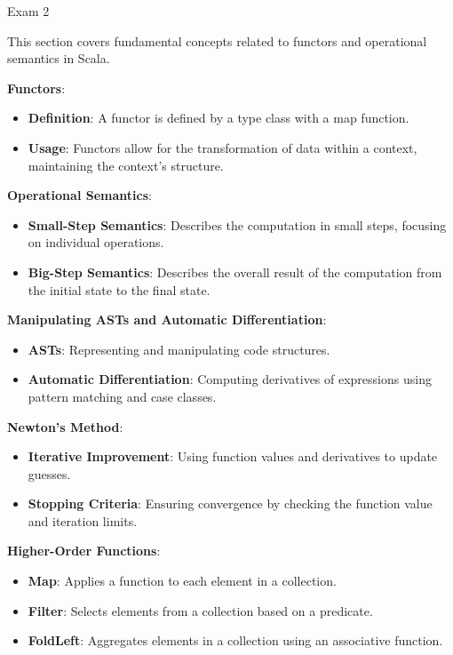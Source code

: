 \begin{examnotes}{Exam 2}
    \begin{highlight}
        This section covers fundamental concepts related to functors and operational semantics in Scala.
    
        \textbf{Functors}:
        \begin{itemize}
            \item \textbf{Definition}: A functor is defined by a type class with a map function.
            \item \textbf{Usage}: Functors allow for the transformation of data within a context, maintaining the context's structure.
        \end{itemize}
        
        \textbf{Operational Semantics}:
        \begin{itemize}
            \item \textbf{Small-Step Semantics}: Describes the computation in small steps, focusing on individual operations.
            \item \textbf{Big-Step Semantics}: Describes the overall result of the computation from the initial state to the final state.
        \end{itemize}
        
        \textbf{Manipulating ASTs and Automatic Differentiation}:
        \begin{itemize}
            \item \textbf{ASTs}: Representing and manipulating code structures.
            \item \textbf{Automatic Differentiation}: Computing derivatives of expressions using pattern matching and case classes.
        \end{itemize}
        
        \textbf{Newton's Method}:
        \begin{itemize}
            \item \textbf{Iterative Improvement}: Using function values and derivatives to update guesses.
            \item \textbf{Stopping Criteria}: Ensuring convergence by checking the function value and iteration limits.
        \end{itemize}
        
        \textbf{Higher-Order Functions}:
        \begin{itemize}
            \item \textbf{Map}: Applies a function to each element in a collection.
            \item \textbf{Filter}: Selects elements from a collection based on a predicate.
            \item \textbf{FoldLeft}: Aggregates elements in a collection using an associative function.
        \end{itemize}
    \end{highlight}


\end{examnotes}
